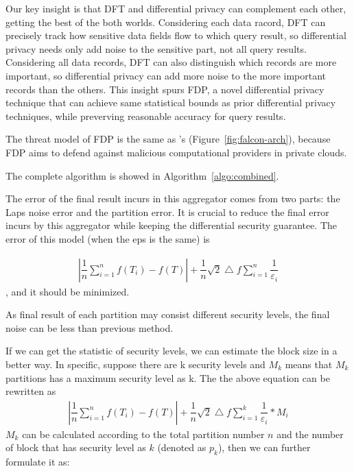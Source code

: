 Our key insight is that DFT and differential privacy can complement each other, 
getting the best of the both worlds. Considering each data racord, DFT can 
precisely track how sensitive data fields flow to which query result, so 
differential privacy needs only add noise to the sensitive part, not all query 
results. Considering all data records, DFT can also distinguish which records 
are more important, so differential privacy can add more noise to the more 
important records than the others. This insight spurs FDP, a novel differential 
privacy technique that can achieve same statistical bounds as prior 
differential privacy techniques, while preverving reasonable accuracy for query 
results.


The threat model of FDP is the same as \kakute's 
(Figure~\ref{fig:falcon-arch}), because FDP aims to defend against malicious 
computational providers in private clouds. 


The complete algorithm is showed in Algorithm~\ref{algo:combined}.



The error of the final result incurs in this aggregator comes from two parts:
the Laps noise error and the partition error. It is crucial to reduce the final
error incurs by this aggregator while keeping the differential security 
guarantee.
The error of this model (when the eps is the same) is

\begin{align}
|\dfrac{1}{n}\sum\limits_{i=1}^n f(T_i) - f(T)| + 
\dfrac{1}{n}\sqrt{2}\bigtriangleup{f}\sum\limits_{i=1}^n\dfrac{1}{\varepsilon_i}
\end{align}, and it should be minimized.

As final result of each partition may consist
different security levels, the final noise can be less than previous method.

If we can get the statistic of security levels, we can estimate the block
size in a better way. In specific, suppose there are k security levels and
$M_k$ means that $M_k$ partitions has a maximum security level as k. The the
above equation can be rewritten as
\begin{align}
  |\dfrac{1}{n}\sum\limits_{i=1}^n f(T_i) - f(T)| +  
\dfrac{1}{n}\sqrt{2}\bigtriangleup{f}\sum\limits_{i=1}^k\dfrac{1}{\varepsilon_i} 
* M_i
\end{align}
$M_k$ can be calculated according to the total partition number $n$ and
the number of block that has security level as $k$ (denoted as $p_k$), then
we can further formulate it as:




